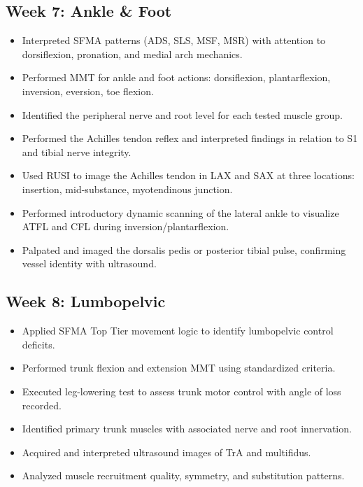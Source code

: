 \subsection*{Week 7: Ankle \& Foot}

\begin{itemize}
  \item [$\square$] Interpreted SFMA patterns (ADS, SLS, MSF, MSR) with attention to dorsiflexion, pronation, and medial arch mechanics.
  \item [$\square$] Performed MMT for ankle and foot actions: dorsiflexion, plantarflexion, inversion, eversion, toe flexion.
  \item [$\square$] Identified the peripheral nerve and root level for each tested muscle group.
  \item [$\square$] Performed the Achilles tendon reflex and interpreted findings in relation to S1 and tibial nerve integrity.
  \item [$\square$] Used RUSI to image the Achilles tendon in LAX and SAX at three locations: insertion, mid-substance, myotendinous junction.
  \item [$\square$] Performed introductory dynamic scanning of the lateral ankle to visualize ATFL and CFL during inversion/plantarflexion.
  \item [$\square$] Palpated and imaged the dorsalis pedis or posterior tibial pulse, confirming vessel identity with ultrasound.
\end{itemize}

\subsection*{Week 8: Lumbopelvic}
\begin{itemize}
  \item [$\square$] Applied SFMA Top Tier movement logic to identify lumbopelvic control deficits.
  \item [$\square$] Performed trunk flexion and extension MMT using standardized criteria.
  \item [$\square$] Executed leg-lowering test to assess trunk motor control with angle of loss recorded.
  \item [$\square$] Identified primary trunk muscles with associated nerve and root innervation.
  \item [$\square$] Acquired and interpreted ultrasound images of TrA and multifidus.
  \item [$\square$] Analyzed muscle recruitment quality, symmetry, and substitution patterns.
\end{itemize}


